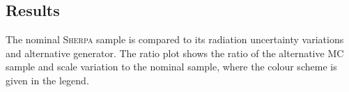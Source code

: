 \subsection{Results}

The nominal  \textsc{Sherpa} \ttW  sample is compared to its radiation uncertainty variations and alternative generator.
The ratio plot shows the ratio of the alternative MC sample and scale variation to the nominal sample, where the colour scheme is given in the legend.


